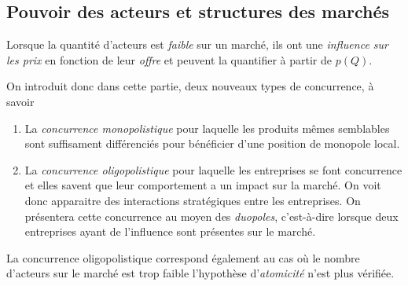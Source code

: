 

\subsection{Pouvoir des acteurs et structures des marchés} %
\label{sec:pouvoir_des_acteurs_et_structures_des_marches}

Lorsque la quantité d'acteurs est \emph{faible} sur un marché, 
ils ont une \emph{influence sur les prix} en fonction de leur \emph{offre} 
et peuvent la quantifier à partir de $p(Q)$. 

On introduit donc dans cette partie, deux nouveaux types de concurrence, à savoir
\begin{enumerate}
  \item La \emph{concurrence monopolistique} pour laquelle les produits mêmes semblables 
  sont suffisament différenciés pour bénéficier d'une position de monopole local. 
  \item La \emph{concurrence oligopolistique} pour laquelle les entreprises se font concurrence
  et elles savent que leur comportement a un impact sur la marché.
  On voit donc apparaitre des interactions stratégiques entre les entreprises.
  On présentera cette concurrence au moyen des \emph{duopoles}, c'est-à-dire lorsque deux entreprises
  ayant de l'influence sont présentes sur le marché.
\end{enumerate}

La concurrence oligopolistique correspond également au cas où le nombre d'acteurs
sur le marché est trop faible l'hypothèse d'\emph{atomicité} n'est plus vérifiée.

